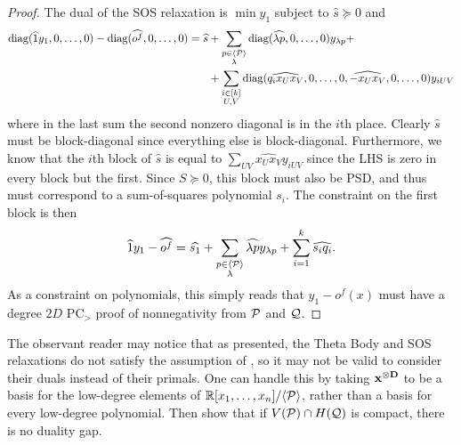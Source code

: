 \begin{proof}
The dual of the SOS relaxation is $\min y_1$ subject to $\hat{s} \succeq 0$ and
\begin{align*}
\text{diag}(\widehat{1}y_1,0,\dots,0) - \text{diag}(\widehat{o^f},0,\dots,0) = \widehat{s} &+ \sum_{\substack{p \in \langle \mathcal P \rangle \\ \lambda}} \text{diag}(\widehat{\lambda p},0,\dots,0) y_{\lambda p} +\\
&+ \sum_{\substack{i \in [k] \\ U,V}} \text{diag}(\widehat{q_ix_Ux_V},0,\dots,0,\widehat{-x_Ux_V},0,\dots,0)y_{iUV}
\end{align*}
where in the last sum the second nonzero diagonal is in the $i$th place. Clearly $\widehat{s}$ must be block-diagonal since everything else is block-diagonal. Furthermore, we know that the $i$th block of $\widehat{s}$ is equal to $\sum_{UV} \widehat{x_Ux_V}y_{iUV}$ since the LHS is zero in every block but the first. Since $S \succeq 0$, this block must also be PSD, and thus must correspond to a sum-of-squares polynomial $s_i$. The constraint on the first block is then
\[\widehat{1}y_1 - \widehat{o^f} = \widehat{s_1} + \sum_{\substack{p \in \langle \mathcal P \rangle \\ \lambda}} \widehat{\lambda p} y_{\lambda p} + \sum_{i=1}^k \widehat{s_i q_i}.\]
As a constraint on polynomials, this simply reads that $y_1 - o^f(x)$ must have a degree $2D$ PC$_>$ proof of nonnegativity from $\mathcal P$ and $\mathcal Q$.
\end{proof}

\begin{remark}
The observant reader may notice that as presented, the Theta Body and SOS relaxations do not satisfy the assumption of , so it may not be valid to consider their duals instead of their primals. One can handle this by taking $\mathbf{x^{\otimes D}}$ to be a basis for the low-degree elements of $\mathbb R[x_1,\dots,x_n]/\langle \mathcal P \rangle$, rather than a basis for every low-degree polynomial. Then \cite{JH16} show that if $V(\mathcal P) \cap H(\mathcal Q)$ is compact, there is no duality gap.
\end{remark}

